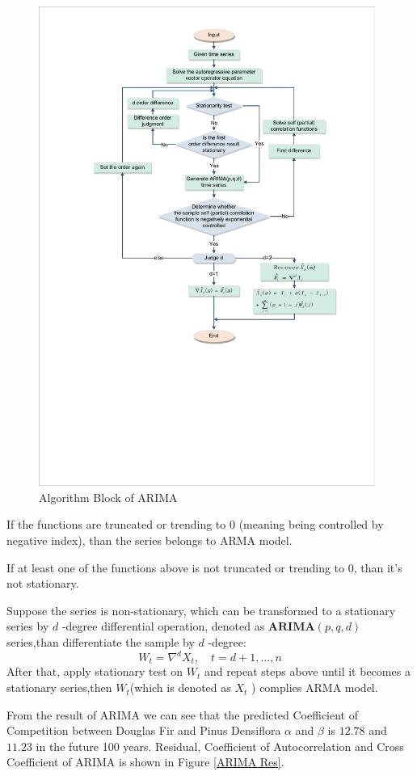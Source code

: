 \documentclass{mcmthesis}
\numberwithin{figure}{section}
\numberwithin{table}{section}
\numberwithin{equation}{section}
\begin{document}
\begin{figure}[htb]
  \centering
  \includegraphics[width =11cm]{code&pic/ARIMA_裁剪页面.pdf}
  \caption{Algorithm Block of ARIMA}\label{ARIMA_ALGO}
\end{figure}
\par
If the functions are truncated or trending to 0 (meaning being controlled
by negative index), than the series belongs to ARMA model.
\par
If at least one of the functions above is not truncated or trending to 0, than
it's not stationary.
\par

Suppose the series is non-stationary, which can be transformed to 
a stationary series by $ d $ -degree differential operation, denoted
as $ \mathbf{ARIMA}(p,q,d) $ series,than differentiate the sample by
$ d $ -degree:
$$
  W_t = \nabla^dX_t,\quad t = d+1,\dots , n
$$ 
After that, apply stationary test on $ W_t $ and repeat steps above 
until it becomes a stationary series,then $ W_t $(which is denoted
as $ X_t $ ) complies ARMA model. 
\par

From the result of ARIMA we can see that the predicted Coefficient of Competition
between  Douglas Fir and Pinus Densiflora $ \alpha  $ and $ \beta $ is $ \bm{12.78} $  and $ \bm{11.23}$
in the future 100 years. Residual, Coefficient of Autocorrelation and Cross Coefficient
of ARIMA is shown in Figure \ref{ARIMA Res}.
\end{document}
